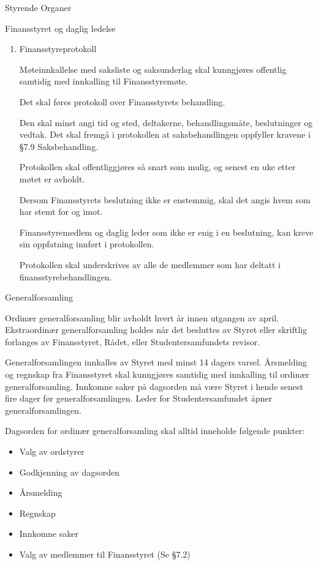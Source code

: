 \begin{lovkapittel}{Styrende Organer}
\begin{lovparagraf}{Finansstyret og daglig ledelse}
\begin{enumerate}
    \item Finansstyreprotokoll
    
    Møteinnkallelse med saksliste og saksunderlag skal kunngjøres offentlig samtidig med innkalling til
    Finansstyremøte.
    
    Det skal føres protokoll over Finansstyrets behandling.
    
    Den skal minst angi tid og sted, deltakerne, behandlingsmåte, beslutninger og vedtak. Det skal fremgå i
    protokollen at saksbehandlingen oppfyller kravene i §7.9 Saksbehandling.
    
    Protokollen skal offentliggjøres så snart som mulig, og senest en uke etter møtet er avholdt.
    
    Dersom Finansstyrets beslutning ikke er enstemmig, skal det angis hvem som har stemt for og imot.
    
    Finansstyremedlem og daglig leder som ikke er enig i en beslutning, kan kreve sin oppfatning innført i
    protokollen.
    
    Protokollen skal underskrives av alle de medlemmer som har deltatt i finansstyrebehandlingen.

   
    \end{enumerate}
    
   \end{lovparagraf}
   
   \begin{lovparagraf}{Generalforsamling}
   
Ordinær generalforsamling blir avholdt hvert år innen utgangen av april. Ekstraordinær generalforsamling holdes når
det besluttes av Styret eller skriftlig forlanges av Finansstyret, Rådet, eller Studentersamfundets revisor.

Generalforsamlingen innkalles av Styret med minst 14 dagers varsel. Årsmelding og regnskap fra Finansstyret skal
kunngjøres samtidig med innkalling til ordinær generalforsamling. Innkomne saker på dagsorden må være Styret i
hende senest fire dager før generalforsamlingen. Leder for Studentersamfundet åpner generalforsamlingen.

Dagsorden for ordinær generalforsamling skal alltid inneholde følgende punkter:

\begin{itemize}
\item Valg av ordstyrer
\item Godkjenning av dagsorden
\item Årsmelding
\item Regnskap
\item Innkomne saker
\item Valg av medlemmer til Finansstyret (Se §7.2)
\end{itemize}


\end{lovparagraf}
\end{lovkapittel}
